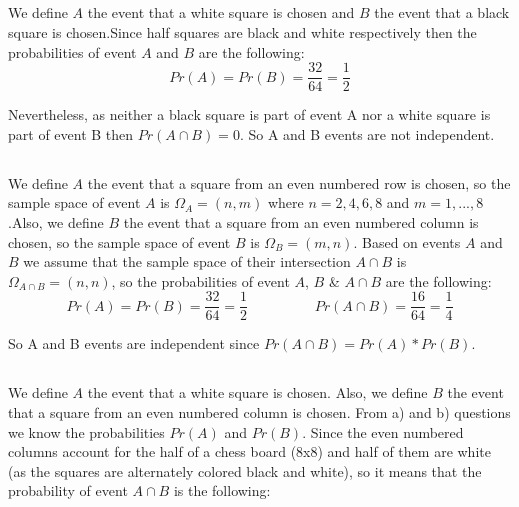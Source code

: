 \documentclass[11pt]{537homework}
\begin{document}
{{{\subsection{}

We define $A$ the event that a white square is chosen and $B$ the event that a black square is chosen.Since half squares are black and white respectively then the probabilities of event $A$ and $B$ are the following:
\begin{equation}
  Pr(A) = Pr(B) = \frac{32}{64} = \frac{1}{2}
\end{equation} 

Nevertheless, as neither a black square is part of event A nor a white square is part of event B then $Pr(A \cap B) = 0$. So A and B events are not independent.

\subsection{}

We define $A$ the event that a square from an even numbered row is chosen, so the sample space of event $A$ is $\Omega_A = (n,m)$ where $n={2,4,6,8}$ and $m={1,...,8}$.Also, we define $B$ the event that a square from an even numbered column is chosen, so the sample space of event $B$ is $\Omega_B = (m,n)$. Based on events $A$ and $B$ we assume that the sample space of their intersection $A \cap B$ is $\Omega_{A \cap B} = (n,n)$, so the probabilities of event $A$, $B$ \& $A \cap B$ are the following:
\begin{equation}
  Pr(A) = Pr(B) = \frac{32}{64} = \frac{1}{2} \hspace{2cm} Pr(A \cap B) = \frac{16}{64} = \frac{1}{4}
\end{equation} 

So A and B events are independent since $Pr( A \cap B) = Pr(A) * Pr(B) $.


\subsection{}

We define $A$ the event that a white square is chosen. Also, we define $B$ the event that a square from an even numbered column is chosen. From a) and b) questions we know the probabilities $Pr(A)$ and $Pr(B)$. Since the even numbered columns account for the half of a chess board (8x8) and half of them are white (as the squares are alternately colored black and white), so it means that the probability of event $A \cap B$ is the following:

}}}
\end{document}
